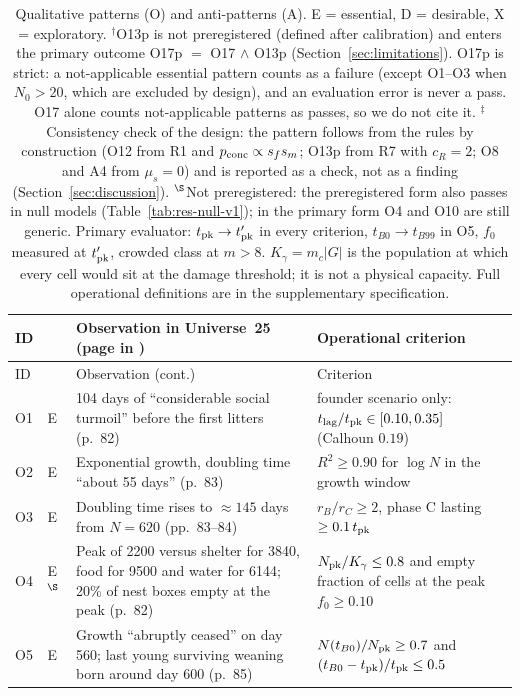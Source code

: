 {\small
\begin{longtable}{@{}p{}p{}p{}p{}@{}}
\caption{Qualitative patterns (O) and anti-patterns (A). E = essential, D = desirable, X = exploratory.
$^\dagger$O13p is not preregistered (defined after calibration) and enters the primary outcome O17p $=$ O17 $\wedge$
O13p (Section~\ref{sec:limitations}). O17p is strict: a not-applicable essential pattern counts as a failure (except
O1--O3 when $N_0>20$, which are excluded by design), and an evaluation error is never a pass. O17 alone counts
not-applicable patterns as passes, so we do not cite it. $^\ddagger$Consistency check of the design: the pattern follows from the rules
by construction (O12 from R1 and $p_{\rm conc}\propto s_fs_m$; O13p from R7 with $c_R=2$; O8 and A4 from $\mu_s=0$)
and is reported as a check, not as a finding (Section~\ref{sec:discussion}). $^\S$Not preregistered: the
preregistered form also passes in null models (Table~\ref{tab:res-null-v1}); in the primary form O4 and O10 are
still generic. Primary evaluator: $t_{\rm pk}\to t'_{\rm pk}$ in every criterion, $t_{B0}\to t_{B99}$ in O5, $f_0$
measured at $t'_{\rm pk}$, crowded class at $m>8$. $K_\gamma=m_c|G|$ is the population at
which every cell would sit at the damage threshold; it is not a physical capacity. Full operational definitions are
in the supplementary specification.}\label{tab:observations}\\
\toprule
ID & & Observation in Universe~25 (page in \cite{Calhoun1973}) & Operational criterion \\
\midrule
\endfirsthead
\toprule
ID & & Observation (cont.) & Criterion \\
\midrule
\endhead
\bottomrule
\endfoot
O1 & E & 104 days of ``considerable social turmoil'' before the first litters (p.~82) & founder scenario only: $t_{\rm lag}/t_{\rm pk}\in[0.10,0.35]$ (Calhoun $0.19$) \\
O2 & E & Exponential growth, doubling time ``about 55 days'' (p.~83) & $R^2\ge 0.90$ for $\log N$ in the growth window \\
O3 & E & Doubling time rises to ${\approx}145$ days from $N=620$ (pp.~83--84) & $r_B/r_C\ge 2$, phase C lasting $\ge 0.1\,t_{\rm pk}$ \\
O4 & E$^\S$ & Peak of 2200 versus shelter for 3840, food for 9500 and water for 6144; 20\% of nest boxes empty at the peak (p.~82) & $N_{\rm pk}/K_\gamma\le 0.8$ and empty fraction of cells at the peak $f_0\ge0.10$ \\
O5 & E & Growth ``abruptly ceased'' on day 560; last young surviving weaning born around day 600 (p.~85) & $N(t_{B0})/N_{\rm pk}\ge 0.7$ and $(t_{B0}-t_{\rm pk})/t_{\rm pk}\le 0.5$ \\

\end{longtable}}
